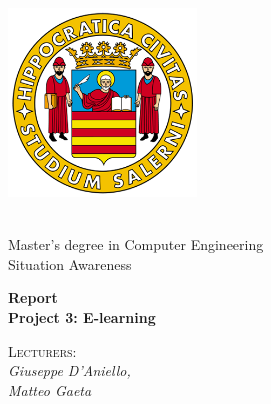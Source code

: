 \begin{titlepage}

    \begin{minipage}[b]{0.3\textwidth}
        \begin{flushleft}
            \includegraphics[width=5cm]{assets/unisa.png}
        \end{flushleft}
    \end{minipage}
    \hfill
    \begin{minipage}[b]{0.7\textwidth}
        \begin{flushright}
                \\ Master's degree in Computer Engineering
                \\ Situation Awareness
        \end{flushright}
    \end{minipage}

    \hrulefill

    \vspace{1cm}

    \begin{Huge}
        \textbf{Report \\ Project 3: E-learning}
    \end{Huge}

    \begin{large}
         
    \end{large}

    \vspace{1.0cm}

    \begin{minipage}[t]{7cm}
        \flushleft
        \textsc{Lecturers:}\\
        \textit{Giuseppe D'Aniello,}\\ 
        \textit{Matteo Gaeta}\\
    \end{minipage}

    \vspace{0.5cm}
    

\end{titlepage}
